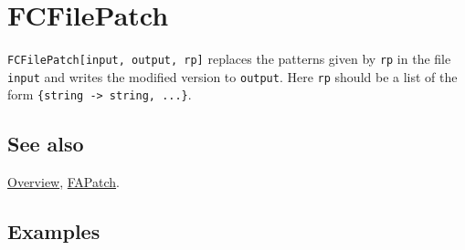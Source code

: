 \documentclass[../FeynCalcManual.tex]{subfiles}
\begin{document}
\hypertarget{fcfilepatch}{%
\section{FCFilePatch}\label{fcfilepatch}}

\texttt{FCFilePatch[\allowbreak{}input,\ \allowbreak{}output,\ \allowbreak{}rp]}
replaces the patterns given by \texttt{rp} in the file \texttt{input}
and writes the modified version to \texttt{output}. Here \texttt{rp}
should be a list of the form
\texttt{\{\allowbreak{}string -> string,\ \allowbreak{}...\}}.

\subsection{See also}

\hyperlink{toc}{Overview}, \hyperlink{fapatch}{FAPatch}.

\subsection{Examples}
\end{document}
